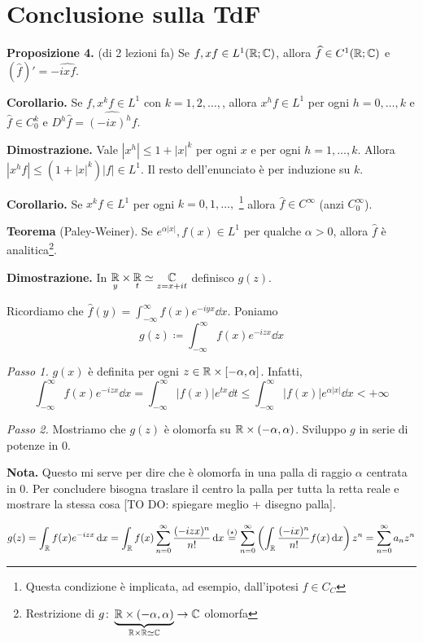 \section{Conclusione sulla TdF}

\textbf{Proposizione 4.} (di 2 lezioni fa)
Se $f,xf \in L^1(\mathbb R;\mathbb C)$, allora $\widehat{f} \in C^1(\mathbb R;\mathbb C)$ e $(\hat{f})' = - \hat{ixf}$.

\textbf{Corollario.} Se $f,x^kf \in L^1$ con $k=1,2,\ldots,$, allora $x^hf \in L^1$ per ogni $h=0,\ldots,k$ e $\hat{f} \in C_0^k$ e $D^h \hat{f} = \hat{(-ix)^h f}$.

\textbf{Dimostrazione.} Vale $|x^h| \leq 1 + |x|^k$ per ogni $x$ e per ogni $h=1,\ldots,k$.
Allora $|x^hf| \leq (1 + |x|^k)|f| \in L^1$.
Il resto dell'enunciato è per induzione su $k$.

\vs

\textbf{Corollario.} Se $x^k f \in L^1$ per ogni $k=0,1,\ldots,$ \footnote{Questa condizione è implicata, ad esempio, dall'ipotesi $f \in C_C$} allora $\hat{f} \in C^\infty$ (anzi $C_0^\infty$).

\vs

\textbf{Teorema} (Paley-Weiner).
Se $e^{\alpha |x|}, f(x) \in L^1$ per qualche $\alpha > 0$, allora $\hat{f}$ è analitica\footnote{Restrizione di $g \colon \underbrace{\mathbb R \times (-\alpha,\alpha)}_{\mathbb R \times \mathbb R \simeq \mathbb C} \to \mathbb C$ olomorfa}.

\textbf{Dimostrazione.} In $\underset{y}{\mathbb R} \times \underset{t}{\mathbb R} \simeq \underset{z=x+it}{\mathbb C}$ definisco $g(z)$.

Ricordiamo che $\hat{f}(y) = \int_{-\infty}^\infty f(x) e^{-iyx} \dd x $.
Poniamo
%
$$
	g(z) \coloneqq \int_{-\infty}^\infty f(x) e^{-izx} \dd x 
$$
%

\textit{Passo 1.} $g(x)$ è definita per ogni $z \in \mathbb R \times [-\alpha,\alpha]$.
Infatti,
%
$$
	\int_{-\infty}^\infty f(x) e^{-izx} \dd x 
	= \int_{-\infty}^\infty |f(x)| e^{tx} \dd t
	\leq \int_{-\infty}^\infty |f(x)| e^{\alpha |x|} \dd x < +\infty
$$
%

\textit{Passo 2.} Mostriamo che $g(z)$ è olomorfa su $\mathbb R \times (-\alpha,\alpha)$.
Sviluppo $g$ in serie di potenze in $0$.

\textbf{Nota.} Questo mi serve per dire che è olomorfa in una palla di raggio $\alpha $ centrata in $0$. Per concludere bisogna traslare il centro la palla per tutta la retta reale e mostrare la stessa cosa [TO DO: spiegare meglio + disegno palla].

%
$$
	g(z) = \int_\mathbb R f(x) e^{-izx} \,\mathrm{d} x 
	= \int_\mathbb R f(x) \sum_{n=0}^\infty \frac{(-izx)^n}{n!} \,\mathrm{d} x
	\overset{(\star)}{=} \sum_{n=0}^{\infty} \left( \int_\mathbb R \frac{(-ix)^n}{n!} f(x) \,\mathrm{d} x \right) z^n
	= \sum_{n=0}^\infty a_n z^n
$$
%


